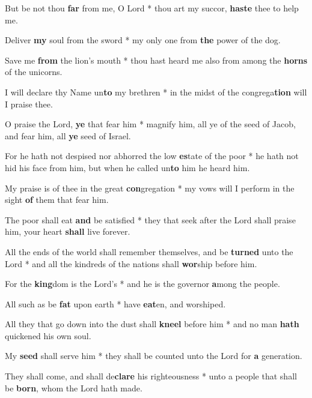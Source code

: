 \begin{multicols}{2}
	But be not thou \textbf{far} from me, O Lord * thou art my succor, \textbf{haste} thee to help me.
	
	Deliver \textbf{my} soul from the sword * my only one from \textbf{the} power of the dog.
	
	Save me \textbf{from} the lion's mouth * thou hast heard me also from among the \textbf{horns} of the unicorns.
	
	I will declare thy Name un\textbf{to} my brethren * in the midst of the congrega\textbf{tion} will I praise thee.
	
	O praise the Lord, \textbf{ye} that fear him * magnify him, all ye of the seed of Jacob, and fear him, all \textbf{ye} seed of Israel.
	
	For he hath not despised nor abhorred the low \textbf{es}tate of the poor * he hath not hid his face from him, but when he called un\textbf{to} him he heard him.
	
	My praise is of thee in the great \textbf{con}gregation * my vows will I perform in the sight \textbf{of} them that fear him.
	
	The poor shall eat \textbf{and} be satisfied * they that seek after the Lord shall praise him, your heart \textbf{shall} live forever.
	
	All the ends of the world shall remember themselves, and be \textbf{turned} unto the Lord * and all the kindreds of the nations shall \textbf{wor}ship before him.
	
	For the \textbf{king}dom is the Lord's * and he is the governor \textbf{a}mong the people.
	
	All such as be \textbf{fat} upon earth * have \textbf{eat}en, and worshiped.
	
	All they that go down into the dust shall \textbf{kneel} before him * and no man \textbf{hath} quickened his own soul.
	
	My \textbf{seed} shall serve him * they shall be counted unto the Lord for \textbf{a} generation.
	
	They shall come, and shall de\textbf{clare} his righteousness * unto a people that shall be \textbf{born}, whom the Lord hath made.
\end{multicols}